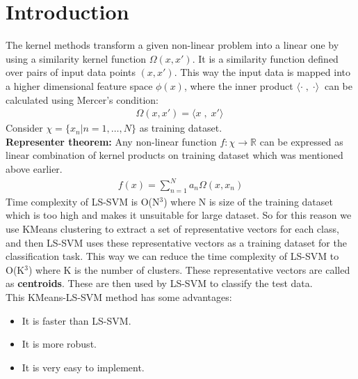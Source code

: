 \documentclass[conference]{IEEEtran}
\begin{document}
    \section{Introduction}\label{sec:introduction}
    The kernel methods transform a given non-linear problem into a linear one by using a similarity kernel function $\Omega(x,x\prime)$.
    It is a similarity function defined over pairs of input data points $(x, x\prime)$.
    This way the input data is mapped into a higher dimensional feature space  $\phi(x)$, where the inner product $ \langle\cdot\;,\;\cdot\rangle\ $ can be calculated using Mercer's condition:
    \begin{align}
        \Omega(x,x\prime) = \langle x \;,\; x\prime\rangle\
    \end{align}
    Consider $\chi = \{x_{n} | n=1,\ldots,N\}$ as training dataset. \\
    \textbf{Representer theorem:} Any non-linear function $f : \chi \longrightarrow \mathbb{R}$ can be expressed as linear combination of kernel products on training dataset which was mentioned above earlier.
    \begin{align}
        f(x) = \sum_{n=1}^{N} a_{n}\Omega(x,x_{n})
    \end{align}
    Time complexity of LS-SVM is O(N$^3$) where N is size of the training dataset which is too high and makes it unsuitable for large dataset.
    So for this reason we use KMeans clustering to extract a set of representative vectors for each class, and then LS-SVM uses these representative vectors as a training dataset for the classification task.
    This way we can reduce the time complexity of LS-SVM to O(K$^3$) where K is the number of clusters.
    These representative vectors are called as \textbf{centroids}.
    These are then used by LS-SVM to classify the test data. \\
    This KMeans-LS-SVM method has some advantages:
    \begin{itemize}
        \item It is faster than LS-SVM\@.
        \item It is more robust.
        \item It is very easy to implement.
    \end{itemize}
\end{document}
